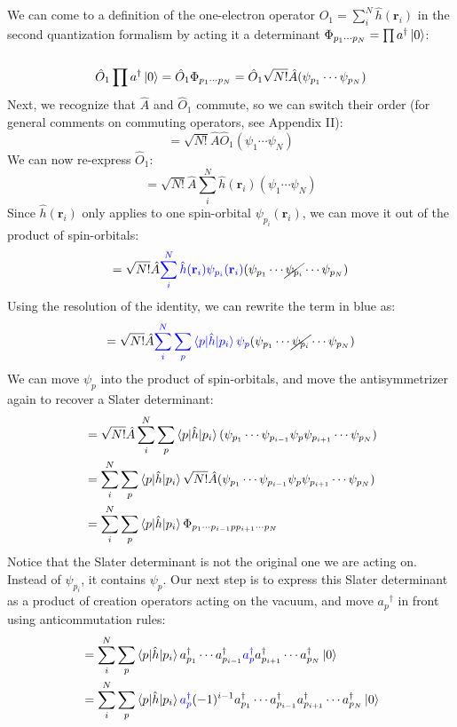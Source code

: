 \documentclass{article}
\newcommand{\dg}{\ensuremath{^\dagger} }
\def\*#1{\mathbf{#1}}
\begin{document}
We can come to a definition of the one-electron operator $\hat{O}_1 = \sum\limits_i^N \hat{h} (\*{r}_i) $  in the second quantization formalism by acting it a determinant $ \Phi_{p_1 \cdots p_N} = \prod a\dg \ket{0} $:  \\ \\
\[\hat{O}_1 \prod a\dg \ket{0} = \hat{O}_1\Phi_{p_1 \cdots p_N} = \hat{O}_1 \sqrt{N!} \hat{A} (\psi_{p_1} \cdots \psi_{p_N}) \]
Next, we recognize that  $\hat{A}$ and $\hat{O}_1$ commute, so we can switch their order (for general comments on commuting operators, see Appendix II): 
\[ = \sqrt{N!}  \hat{A} \hat{O}_1  (\psi_1 \cdots \psi_N) \]
We can now re-express $\hat{O}_1$: 
\[=  \sqrt{N!}  \hat{A}  \sum_i^N \hat{h} (\*{r}_i) (\psi_1 \cdots \psi_N) \]
Since $\hat{h} (\*{r}_i) $ only applies to one spin-orbital $\psi_{p_i}(\*{r}_i)$, we can move it out of the product of spin-orbitals:
\[=  \sqrt{N!}  \hat{A} {\color{blue}  \sum_i^N \hat{h} (\*{r}_i) \psi_{p_i} (\*{r}_i)} (\psi_{p_1} \cdots \cancel{\psi_{p_i}} \cdots \psi_{p_N}) \]
Using the resolution of the identity, we can rewrite the term in {\color{blue}blue} as: 
\[=  \sqrt{N!}   \hat{A}  {\color{blue} \sum_i^N  \sum_p \braket{p | \hat{h} | p_i } \psi_p } (\psi_{p_1} \cdots \cancel{\psi_{p_i}} \cdots \psi_{p_N}) \]
 We can move $\psi_p$ into the product of spin-orbitals, and move the antisymmetrizer again to recover a Slater determinant: 
\begin{align*}
&= \sqrt{N!}  \hat{A}   \sum_i^N  \sum_p \braket{p | \hat{h} | p_i }  (\psi_{p_1} \cdots \psi_{p_{i-1}} \psi_p \psi_{p_{i+1}} \cdots \psi_{p_N}) \\
&=\sum_i^N  \sum_p \braket{p | \hat{h} | p_i } \sqrt{N!}  \hat{A} (\psi_{p_1} \cdots \psi_{p_{i-1}} \psi_p \psi_{p_{i+1}} \cdots \psi_{p_N}) \\
&=\sum_i^N  \sum_p \braket{p | \hat{h} | p_i } \Phi_{{p_1} \cdots {p_{i-1}} p {p_{i+1}} \cdots {p_N}} \\
\end{align*}
Notice that the Slater determinant is not the original one we are acting on. Instead of $\psi_{p_i}$, it contains $\psi_p$.  
Our next step is to express this Slater determinant as a product of creation operators acting on the vacuum, and move $a_p\dg$ in front using anticommutation rules:
\begin{align*}
&= \sum_i^N  \sum_p \braket{p | \hat{h} | p_i } a_{p_1}^\dagger \cdots a_{p_{i-1}}^\dagger {\color{blue}a_p^\dagger} a_{p_{i+1}}^\dagger \cdots a_{p_N}^\dagger \ket{0}\\
&= \sum_i^N  \sum_p \braket{p | \hat{h} | p_i } {\color{blue}a_p^\dagger} (-1)^{i-1} a_{p_1}^\dagger \cdots a_{p_{i-1}}^\dagger a_{p_{i+1}}^\dagger \cdots a_{p_N}^\dagger \ket{0}\\
\end{align*}
\end{document}
